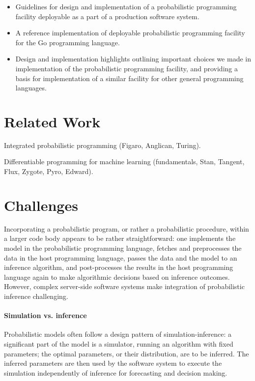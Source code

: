 \documentclass[sigplan,review,10pt,anonymous]{acmart}
\begin{document}
\begin{sloppypar}
	\begin{itemize}
		\item Guidelines for design and implementation of a
			probabilistic programming facility deployable as a part 
			of a production software system.
		\item A reference implementation of deployable probabilistic
			programming facility for the Go programming language.
		\item Design and implementation highlights outlining
			important choices we made in implementation of the
			probabilistic programming facility, and providing a
			basis for implementation of a similar facility for
			other general programming languages.
	\end{itemize}

\section{Related Work}

Integrated probabilistic programming (Figaro, Anglican, Turing).

Differentiable programming for machine learning (fundamentals,
Stan, Tangent, Flux, Zygote, Pyro, Edward).

\section{Challenges}

Incorporating a probabilistic program, or rather a probabilistic
procedure, within a larger code body appears to be rather
straightforward: one implements the model in the probabilistic
programming language, fetches and preprocesses the data in the
host programming language, passes the data and the model to an
inference algorithm, and post-processes the results in the
host programming language again to make algorithmic
decisions based on inference outcomes. However, complex
server-side software systems make integration of probabilistic
inference challenging. 

\paragraph{Simulation vs. inference} Probabilistic models
often follow a design pattern of simulation-inference: a
significant part of the model is a simulator, running an
algorithm with fixed parameters; the optimal parameters, or
their distribution, are to be inferred. The inferred parameters
are then used by the software system to execute the simulation
independently of inference for forecasting and decision making.


\end{sloppypar}
\end{document}
